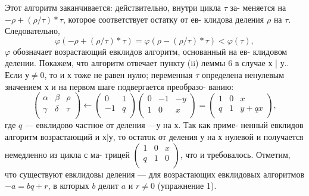 \begin{myproof}
Этот алгоритм заканчивается: действительно, внутри цикла $\tau$ за- \linebreak меняется на $ -\rho + (\rho / \tau) * \tau$, которое соответствует остатку от ев- \linebreak клидова деления $\rho$ на $\tau$. Следовательно, 
$$\varphi(-\rho + (\rho / \tau) * \tau) = \varphi (\rho - (\rho / \tau) * \tau) < \varphi(\tau),$$
$\varphi$ обозначает возрастающий евклидов алгоритм, основанный на ев- \linebreak клидовом делении.  
Покажем, что алгоритм отвечает пункту (ii) леммы 6 в случае х | у.. Если $у \ne 0$, то и $х$ тоже не равен нулю; переменная $\tau$ определена \linebreak ненулевым значением $х$ и на первом шаге подвергается преобразо- \linebreak ванию:  
$${\left( \begin{array}{ccc}
\alpha & \beta & \rho \\
\gamma & \delta & \tau \\
\end{array} \right)} \gets {\left( \begin{array}{ccc}
0 & 1 \\
-1 & q \\
\end{array} \right)} {\left( \begin{array}{ccc}
0 & -1 & -y \\
1 & 0 & x \\
\end{array} \right)} = {\left( \begin{array}{ccc}
1 & 0 & x \\
q & 1 & y+qx \\
\end{array} \right)},$$
где $q$ — евклидово частное от деления $—у$ на $х$. Так как приме- \linebreak ненный евклидов алгоритм возрастающий и $х | у$, то остаток от \linebreak деления $у$ на $х$ нулевой и получается немедленно из цикла с ма- \linebreak трицей ${\left( \begin{array}{ccc}
1 & 0 & x \\
q & 1 & 0 \\
\end{array} \right)}$, что и требовалось. Отметим, что существуют \linebreak
евклидовы деления --- для возрастающих евклидовых алгоритмов \linebreak  $- a = bq + r$, в которых $b$ делит $a$ и $r \ne 0$ (упражнение 1).  


\end{myproof}
